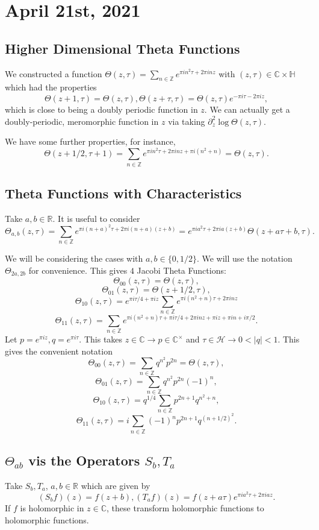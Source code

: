\documentclass[12pt]{scrartcl}
\newcommand{\Z}{\mathbb{Z}}
\newcommand{\R}{\mathbb{R}}
\newcommand{\C}{\mathbb C}
\let \mc \mathcal
\begin{document}
\section{April 21st, 2021}
\subsection{Higher Dimensional Theta Functions}
We constructed a function $\Theta(z, \tau) = \sum_{n \in \Z} e^{\pi i n^2 \tau + 2 \pi i n z}$ with $(z, \tau) \in \C \times \mathbb H$ which had the properties
$$\Theta(z+1, \tau) = \Theta(z, \tau), \Theta(z + \tau, \tau) = \Theta(z, \tau) e^{- \pi i \tau - 2\pi i z},$$
which is close to being a doubly periodic function in $z$.  We can actually get a doubly-periodic, meromorphic function in $z$ via taking $\partial_z^2 \log \Theta(z, \tau)$.

We have some further properties, for instance,
$$\Theta(z + 1/2, \tau + 1) = \sum_{n \in \Z} e^{\pi i n^2 \tau + 2 \pi i n z + \pi i (n^2 + n)} =\Theta(z, \tau).$$
\subsection{Theta Functions with Characteristics}
Take $a, b \in \R$.  It is useful to consider
$$\Theta_{a, b}(z, \tau) = \sum_{n \in \Z} e^{\pi i(n + a)^2 \tau + 2\pi i(n + a)(z + b)}= e^{\pi i a^2 \tau + 2 \pi i a (z + b)}\Theta(z + a\tau + b, \tau).$$

We will be considering the cases with $a, b \in \{0, 1/2\}$.  We will use the notation $\Theta_{2a, 2b}$ for convenience.  This gives $4$ Jacobi Theta Functions:
$$\Theta_{00}(z, \tau) = \Theta(z, \tau),$$
$$\Theta_{01}(z, \tau) = \Theta(z + 1/2, \tau),$$
$$\Theta_{10}(z, \tau) = e^{\pi i \tau/4 + \pi i z}\sum_{n \in \Z} e^{\pi i(n^2 + n)\tau + 2\pi i n z} $$
$$\Theta_{11}(z, \tau) = \sum_{n \in \Z} e^{\pi i (n^2 + n) \tau + \pi i \tau/4 + 2\pi i n z + \pi i z + \pi i n + i\pi / 2}.$$
Let $p = e^{\pi i z}, q = e^{\pi i \tau}$.  This takes $z \in \C \to p \in \C^\times$ and $\tau \in \mc H\to 0 < |q| < 1$.  This gives the convenient notation
$$\Theta_{00}(z, \tau) = \sum_{n \in \Z} q^{n^2} p^{2n} = \Theta(z, \tau),$$
$$\Theta_{01}(z, \tau) = \sum_{n \in \Z } q^{n^2} p^{2n}(-1)^n,$$
$$\Theta_{10}(z, \tau) = q^{1/4}\sum_{n \in \Z} p^{2n+1}q^{n^2 + n},$$
$$\Theta_{11}(z, \tau) = i\sum_{n \in \Z} (-1)^n p^{2n+1}q^{(n+1/2)^2}.$$

\subsection{$\Theta_{ab}$ vis the Operators $S_b, T_a$}
Take $S_b, T_a$, $a, b\in \R$ which are given by
$$(S_bf)(z) = f(z + b), (T_a f)(z) = f(z + a\tau) e^{\pi i a^2 \tau + 2\pi i a z}.$$
If $f$ is holomorphic in $z \in \C$, these transform holomorphic functions to holomorphic functions.
\end{document}
